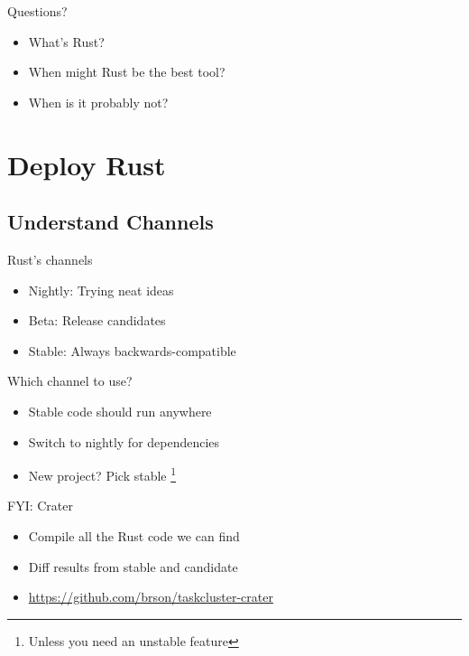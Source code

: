 \documentclass[xcolor={svgnames},hyperref]{beamer}
\begin{document}
    \begin{frame}
        Questions?
        \begin{itemize}
            \item What's Rust?
            \item When might Rust be the best tool?
            \item When is it probably not?
        \end{itemize}
    \end{frame}

\section{Deploy Rust}

    \subsection{Understand Channels}

    \begin{frame}
        Rust's channels
        \begin{itemize}
            \item Nightly: Trying neat ideas
            \item Beta: Release candidates
            \item Stable: Always backwards-compatible
        \end{itemize}
    \end{frame}

    \begin{frame}
        Which channel to use?
        \begin{itemize}
            \item Stable code should run anywhere
            \item Switch to nightly for dependencies
            \item New project? Pick stable \footnote{Unless you need an
                  unstable feature}
        \end{itemize}
    \end{frame}

    \begin{frame}
        FYI: Crater
        \begin{itemize}
            \item Compile all the Rust code we can find
            \item Diff results from stable and candidate
            \item \url{https://github.com/brson/taskcluster-crater}
        \end{itemize}
    \end{frame}
\end{document}
